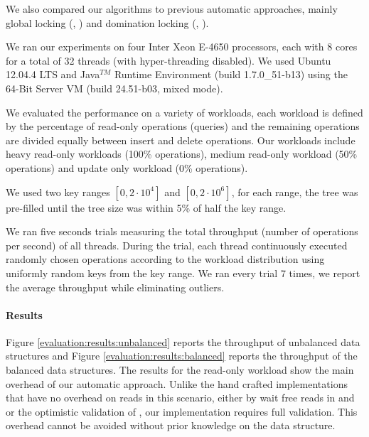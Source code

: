 We also compared our algorithms to previous automatic approaches, 
mainly global locking (\globalTree, \globalTreap) 
and domination locking (\domTree, \domTreap). 

We ran our experiments on four Inter Xeon E-4650 processors, 
each with 8 cores for a total of 32 threads 
(with hyper-threading disabled). 
We used Ubuntu 12.04.4 LTS and Java$^{TM}$ Runtime Environment (build
1.7.0\_51-b13) using the 64-Bit Server VM (build 24.51-b03, mixed mode).


We evaluated the performance on a variety of workloads, 
each workload is defined by the percentage of read-only
operations (\getOP queries) and the remaining operations 
are divided equally between insert and delete operations.
Our workloads include heavy read-only workloads
(100\% \getOP operations), medium read-only workload 
(50\% \getOP operations) and update only workload
(0\% \getOP operations). 

We used two key ranges $[0,2\cdot10^4]$ and $[0,2\cdot10^6]$,
for each range, the tree was pre-filled until the tree size was 
within 5\% of half the key range.   

We ran five seconds trials measuring the total throughput
(number of operations per second) of all threads.
During the trial, each thread continuously executed randomly
chosen operations according to the workload distribution 
using uniformly random keys from the key range.  
We ran every trial 7 times, we report the average throughput
while eliminating outliers.

\paragraph{Results} Figure \ref{evaluation:results:unbalanced} 
reports the throughput of unbalanced data structures and Figure 
\ref{evaluation:results:balanced} reports
the throughput of the balanced data structures. 
The results for the read-only workload show the main overhead
of our automatic approach. Unlike the hand crafted implementations
that have no overhead on reads in this scenario, either by wait free reads in
\danaTree and \danaAVL or the optimistic validation of \bronson, 
our implementation requires full \readSet validation.
This overhead cannot be avoided without prior knowledge on the
data structure.
 
